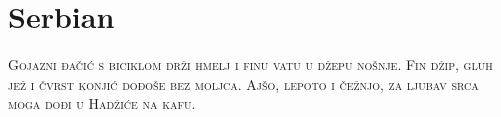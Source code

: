

\presection\section*{\checkno Serbian}\postsection

\noindent\textsc{
Gojazni đačić s biciklom drži hmelj i finu vatu u džepu nošnje.
Fin džip, gluh jež i čvrst konjić dođoše bez moljca.
Ajšo, lepoto i čežnjo, za ljubav srca moga dođi u Hadžiće na kafu.
}